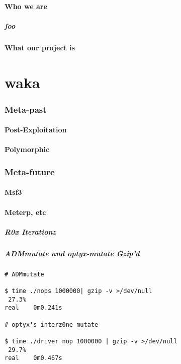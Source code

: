 \documentclass{beamer}
\begin{document}
\subsection{Who we are}
\begin{frame}
  \frametitle{foo}
\end{frame}
\subsection{What our project is}

\part{waka}
\section{Meta-past}

\subsection{Post-Exploitation}
\subsection{Polymorphic}

\section{Meta-future}

\subsection{Msf3}
\subsection{Meterp, etc}

\newcommand{\incshi}[1]{\texttt{[image: \#1]}}

\begin{frame}
  \frametitle{R0x Iterationz}
  \only<9>{\incshi{shi8}}
  \only<8>{\incshi{shi7}}
  \only<7>{\incshi{shi6}}
  \only<6>{\incshi{shi5}}
  \only<5>{\incshi{shi4}}
  \only<4>{\incshi{shi3}}
  \only<3>{\incshi{shi2}}
  \only<2>{\incshi{shi1}}
  \only<1>{\incshi{shi0}}
\end{frame}

\begin{frame}[fragile]
  \frametitle{ADMmutate and optyx-mutate Gzip'd}
  {\footnotesize
  \begin{verbatim}
# ADMmutate

$ time ./nops 1000000| gzip -v >/dev/null
 27.3%
real    0m0.241s

# optyx's interz0ne mutate

$ time ./driver nop 1000000 | gzip -v >/dev/null
 29.7%
real    0m0.467s
\end{verbatim}
}
\end{frame}
\end{document}
